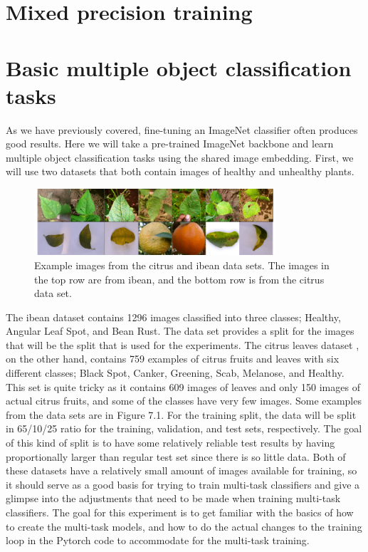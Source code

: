 \section{Mixed precision training}

\section{Basic multiple object classification tasks}
As we have previously covered, fine-tuning an ImageNet classifier often produces good results. 
Here we will take a pre-trained ImageNet backbone and learn multiple object classification tasks using the shared image embedding.
First, we will use two datasets that both contain images of healthy and unhealthy plants.

\begin{figure}[h!]
    \centering
    \includegraphics[width=0.8\textwidth]{imgs/citrus_beans_examples.png}
    \caption{Example images from the citrus and ibean data sets.
    The images in the top row are from ibean, and the bottom row is from the citrus data set.}
\end{figure}

The ibean dataset \citep{beansdata} contains 1296 images classified into three classes; Healthy, Angular Leaf Spot, and Bean Rust.
The data set provides a split for the images that will be the split that is used for the experiments.
The citrus leaves dataset \citep{citrusdata}, on the other hand, contains 759 examples of citrus fruits and leaves with six different classes; Black Spot, Canker, Greening, Scab, Melanose, and Healthy.
This set is quite tricky as it contains 609 images of leaves and only 150 images of actual citrus fruits, and some of the classes have very few images.
Some examples from the data sets are in Figure 7.1.
For the training split, the data will be split in 65/10/25 ratio for the training, validation, and test sets, respectively.
The goal of this kind of split is to have some relatively reliable test results by having proportionally larger than regular test set since there is so little data.
Both of these datasets have a relatively small amount of images available for training, so it should serve as a good basis for trying to train multi-task classifiers and give a glimpse into the adjustments that need to be made when training multi-task classifiers.
The goal for this experiment is to get familiar with the basics of how to create the multi-task models, and how to do the actual changes to the training loop in the Pytorch code to accommodate for the multi-task training.


